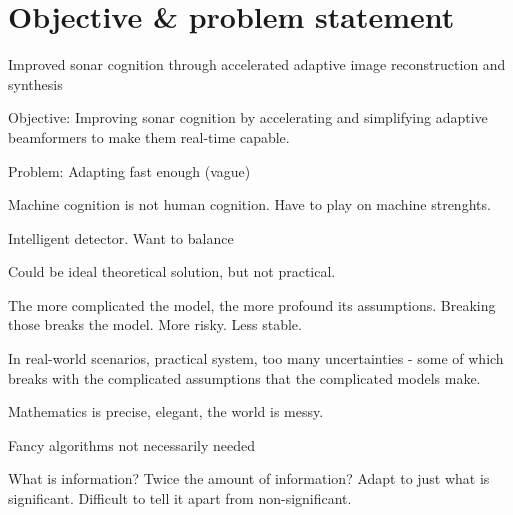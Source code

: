 {\section{Objective \& problem statement}




Improved sonar cognition through accelerated adaptive image reconstruction and synthesis

Objective: Improving sonar cognition by accelerating and simplifying adaptive beamformers to make them real-time capable.

Problem: Adapting fast enough (vague)

Machine cognition is not human cognition. Have to play on machine strenghts. 


Intelligent detector. Want to balance 

Could be ideal theoretical solution, but not practical. 

The more complicated the model, the more profound its assumptions. Breaking those breaks the model. More risky. Less stable. 

In real-world scenarios, practical system, too many uncertainties - some of which breaks with the complicated assumptions that the complicated models make. 

Mathematics is precise, elegant, the world is messy. 

Fancy algorithms not necessarily needed

What is information? Twice the amount of information? Adapt to just what is significant. Difficult to tell it apart from non-significant. 

%
%

}
